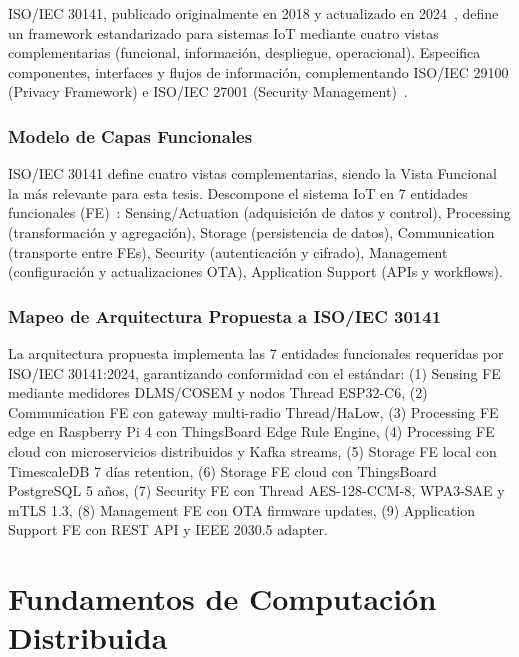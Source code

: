ISO/IEC 30141, publicado originalmente en 2018 y actualizado en 2024~\cite{ISOIEC30141v2024}, define un framework estandarizado para sistemas IoT mediante cuatro vistas complementarias (funcional, información, despliegue, operacional). Especifica componentes, interfaces y flujos de información, complementando ISO/IEC 29100 (Privacy Framework) e ISO/IEC 27001 (Security Management)~\cite{ISOIEC30141v2024,tangResearchInteroperabilityIoT}.

\subsubsection{Modelo de Capas Funcionales}

ISO/IEC 30141 define cuatro vistas complementarias, siendo la Vista Funcional la más relevante para esta tesis. Descompone el sistema IoT en 7 entidades funcionales (FE)~\cite{tangResearchInteroperabilityIoT}: Sensing/Actuation (adquisición de datos y control), Processing (transformación y agregación), Storage (persistencia de datos), Communication (transporte entre FEs), Security (autenticación y cifrado), Management (configuración y actualizaciones OTA), Application Support (APIs y workflows).

\subsubsection{Mapeo de Arquitectura Propuesta a ISO/IEC 30141}

La arquitectura propuesta implementa las 7 entidades funcionales requeridas por ISO/IEC 30141:2024, garantizando conformidad con el estándar: (1) Sensing FE mediante medidores DLMS/COSEM y nodos Thread ESP32-C6, (2) Communication FE con gateway multi-radio Thread/HaLow, (3) Processing FE edge en Raspberry Pi 4 con ThingsBoard Edge Rule Engine, (4) Processing FE cloud con microservicios distribuidos y Kafka streams, (5) Storage FE local con TimescaleDB 7 días retention, (6) Storage FE cloud con ThingsBoard PostgreSQL 5 años, (7) Security FE con Thread AES-128-CCM-8, WPA3-SAE y mTLS 1.3, (8) Management FE con OTA firmware updates, (9) Application Support FE con REST API y IEEE 2030.5 adapter.

\section{Fundamentos de Computación Distribuida}
\label{sec:marco-edge-cloud}


